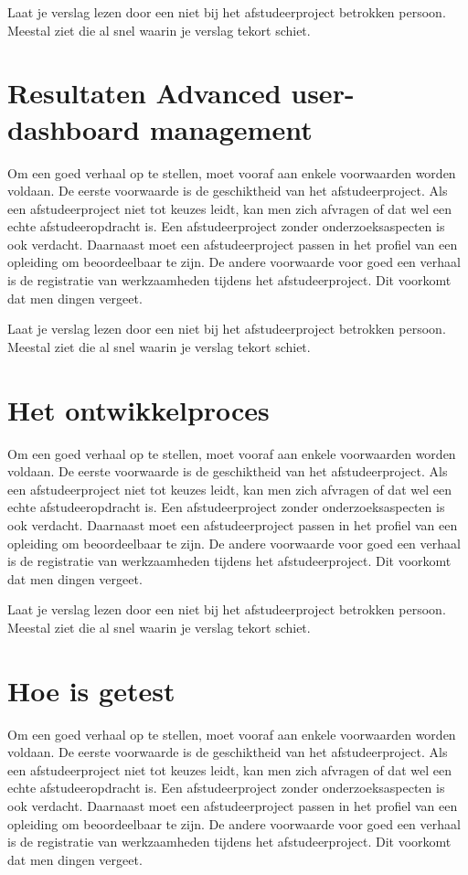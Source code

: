 		
		Laat je verslag lezen door een niet bij het afstudeerproject betrokken
		persoon. Meestal ziet die al snel waarin je verslag tekort schiet.
		\section{Resultaten  Advanced user- dashboard management}
		Om een goed verhaal op te stellen, moet vooraf aan enkele voorwaarden
		worden voldaan. De eerste voorwaarde is de geschiktheid van het
		afstudeerproject. Als een afstudeerproject niet tot keuzes leidt, kan
		men zich afvragen of dat wel een echte afstudeeropdracht is. Een
		afstudeerproject zonder onderzoeksaspecten is ook verdacht. Daarnaast
		moet een afstudeerproject passen in het profiel van een opleiding om
		beoordeelbaar te zijn. De andere voorwaarde voor goed een verhaal is
		de registratie van werkzaamheden tijdens het afstudeerproject. Dit
		voorkomt dat men dingen vergeet.
		
		
		Laat je verslag lezen door een niet bij het afstudeerproject betrokken
		persoon. Meestal ziet die al snel waarin je verslag tekort schiet.
		\section{Het ontwikkelproces}
		Om een goed verhaal op te stellen, moet vooraf aan enkele voorwaarden
		worden voldaan. De eerste voorwaarde is de geschiktheid van het
		afstudeerproject. Als een afstudeerproject niet tot keuzes leidt, kan
		men zich afvragen of dat wel een echte afstudeeropdracht is. Een
		afstudeerproject zonder onderzoeksaspecten is ook verdacht. Daarnaast
		moet een afstudeerproject passen in het profiel van een opleiding om
		beoordeelbaar te zijn. De andere voorwaarde voor goed een verhaal is
		de registratie van werkzaamheden tijdens het afstudeerproject. Dit
		voorkomt dat men dingen vergeet.
		
		
		Laat je verslag lezen door een niet bij het afstudeerproject betrokken
		persoon. Meestal ziet die al snel waarin je verslag tekort schiet.
		\section{Hoe is getest}
		Om een goed verhaal op te stellen, moet vooraf aan enkele voorwaarden
		worden voldaan. De eerste voorwaarde is de geschiktheid van het
		afstudeerproject. Als een afstudeerproject niet tot keuzes leidt, kan
		men zich afvragen of dat wel een echte afstudeeropdracht is. Een
		afstudeerproject zonder onderzoeksaspecten is ook verdacht. Daarnaast
		moet een afstudeerproject passen in het profiel van een opleiding om
		beoordeelbaar te zijn. De andere voorwaarde voor goed een verhaal is
		de registratie van werkzaamheden tijdens het afstudeerproject. Dit
		voorkomt dat men dingen vergeet.
		
